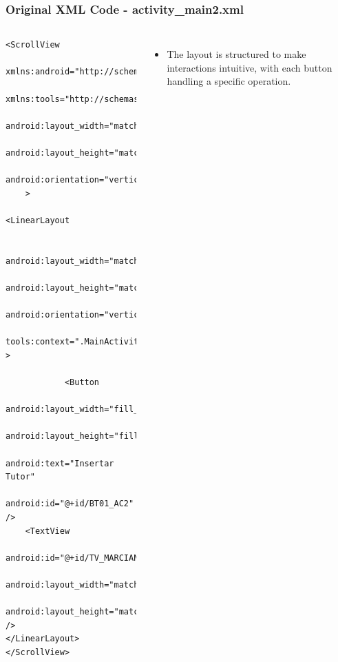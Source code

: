 \documentclass[pdf,
serif,
compress,
xcolor=table,
dvipsnames,
spanish,
aspectratio=169]{beamer}
\begin{document}
\begin{frame}[fragile]
    \frametitle{Original XML Code - activity\_main2.xml}    
\begin{columns}
    \begin{verbatim}
<ScrollView
    xmlns:android="http://schemas.android.com/apk/res/android"
    xmlns:tools="http://schemas.android.com/tools"
    android:layout_width="match_parent"
    android:layout_height="match_parent"
    android:orientation="vertical"
    >

<LinearLayout 
    
    android:layout_width="match_parent"
    android:layout_height="match_parent"
    android:orientation="vertical"
    tools:context=".MainActivity" >
    
	        <Button
	            android:layout_width="fill_parent"
	            android:layout_height="fill_parent"
	            android:text="Insertar Tutor"
	            android:id="@+id/BT01_AC2"   />
	<TextView
		android:id="@+id/TV_MARCIANO1"
		android:layout_width="match_parent"
		android:layout_height="match_parent" />
</LinearLayout>
</ScrollView>

    \end{verbatim}
\begin{itemize}\tiny
\item The layout is structured to make interactions intuitive, with each button handling a specific operation.
\end{itemize}
\end{columns}  
\end{frame}

\end{document}
